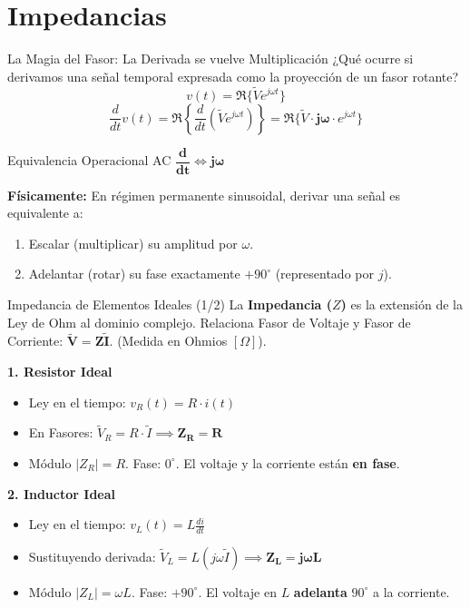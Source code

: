 \documentclass[aspectratio=169, 10pt]{beamer}
\begin{document}
\section{Impedancias}
\begin{frame}{La Magia del Fasor: La Derivada se vuelve Multiplicación}
    ¿Qué ocurre si derivamos una señal temporal expresada como la proyección de un fasor rotante?
    $$ v(t) = \Re \{ \tilde{V} e^{j\omega t} \} $$
    $$ \frac{d}{dt} v(t) = \Re \left\{ \frac{d}{dt} \left( \tilde{V} e^{j\omega t} \right) \right\} = \Re \{ \tilde{V} \cdot \mathbf{j\omega} \cdot e^{j\omega t} \} $$
    
    \begin{alertblock}{Equivalencia Operacional AC}
        \centering $\mathbf{\dfrac{d}{dt} \iff j\omega}$
    \end{alertblock}
    \vspace{0.2cm}
    \textbf{Físicamente:} En régimen permanente sinusoidal, derivar una señal es equivalente a:
    \begin{enumerate}
        \item Escalar (multiplicar) su amplitud por $\omega$.
        \item Adelantar (rotar) su fase exactamente $+90^\circ$ (representado por $j$).
    \end{enumerate}
\end{frame}

\begin{frame}{Impedancia de Elementos Ideales (1/2)}
    La \textbf{Impedancia ($Z$)} es la extensión de la Ley de Ohm al dominio complejo. Relaciona Fasor de Voltaje y Fasor de Corriente: $\mathbf{\tilde{V} = Z \tilde{I}}$. (Medida en Ohmios $[\Omega]$).
    
    \vspace{0.3cm}
    \textbf{1. Resistor Ideal}
    \begin{itemize}
        \item Ley en el tiempo: $v_R(t) = R \cdot i(t)$
        \item En Fasores: $\tilde{V}_R = R \cdot \tilde{I} \implies \mathbf{Z_R = R}$
        \item Módulo $|Z_R| = R$. Fase: $0^\circ$. El voltaje y la corriente están \textbf{en fase}.
    \end{itemize}
    
    \vspace{0.2cm}
    \textbf{2. Inductor Ideal}
    \begin{itemize}
        \item Ley en el tiempo: $v_L(t) = L \frac{di}{dt}$
        \item Sustituyendo derivada: $\tilde{V}_L = L (j\omega \tilde{I}) \implies \mathbf{Z_L = j\omega L}$
        \item Módulo $|Z_L| = \omega L$. Fase: $+90^\circ$. El voltaje en $L$ \textbf{adelanta} $90^\circ$ a la corriente.
    \end{itemize}
\end{frame}
\end{document}
